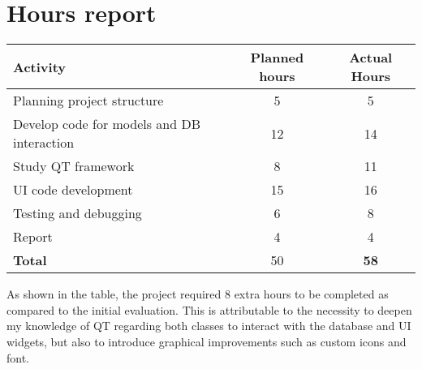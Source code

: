 \documentclass[10pt]{article}
\begin{document}
\section{Hours report}
\begin{table}[h]
    \centering
    \begin{tabular}{|l|c|c|}
        \hline
        \textbf{Activity}                          & \textbf{Planned hours} & \textbf{Actual Hours} \\\hline
        Planning project structure                 & 5                      & 5                     \\
        Develop code for models and DB interaction & 12                     & 14                    \\
        Study QT framework                         & 8                      & 11                    \\
        UI code development                        & 15                     & 16                    \\
        Testing and debugging                      & 6                      & 8                     \\
        Report                                     & 4                      & 4                     \\\hline
        \textbf{Total}                             & 50                     & \textbf{58}           \\\hline
    \end{tabular}
\end{table}
As shown in the table, the project required 8 extra hours to be completed as
compared to the initial evaluation. This is attributable to the necessity to
deepen my knowledge of QT regarding both classes to interact with the database
and UI widgets, but also to introduce graphical improvements such as custom
icons and font.
\end{document}
